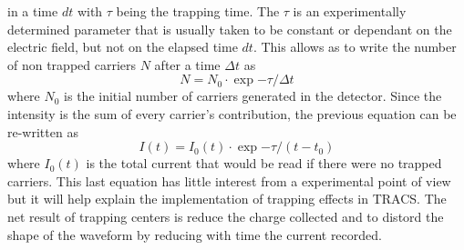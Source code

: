 in a time $dt$ with $\tau$ being the trapping time. The $\tau$ is an experimentally determined parameter that is usually taken to be constant or dependant on the electric field, but not on the elapsed time $dt$. This allows as to write the number of non trapped carriers $N$ after a time $\Delta t$ as
\[N = N_0 \cdot \exp{- \tau/\Delta t} \]
where $N_0$ is the initial number of carriers generated in the detector. Since the intensity is the sum of every carrier's contribution, the previous equation can be re-written as
\begin{equation}
	I(t) = I_0(t) \cdot \exp{-\tau / (t-t_0)}
 \label{eq:trapCurr}
\end{equation}
where $I_0(t)$ is the total current that would be read if there were no trapped carriers. This last equation has little interest from a experimental point of view but it will help explain the implementation of trapping effects in TRACS. The net result of trapping centers is reduce the charge collected and to distord the shape of the waveform by reducing with time the current recorded.

